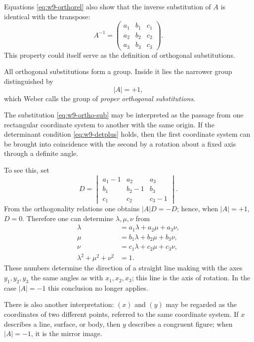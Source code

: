 \documentclass[11pt,a4paper]{book}
\begin{document}
Equations \eqref{eq:w9-orthorel} also show that the inverse substitution of $A$ is identical with the transpose:
\[
 A^{-1}=\begin{pmatrix}
 a_1&b_1&c_1\\
 a_2&b_2&c_2\\
 a_3&b_3&c_3
 \end{pmatrix}.
\]
This property could itself serve as the definition of orthogonal substitutions.

All orthogonal substitutions form a group.  Inside it lies the narrower group distinguished by
\begin{equation}\label{eq:w9-detplus}
 |A|=+1,
\end{equation}
which Weber calls the group of \emph{proper orthogonal substitutions}.

The substitution \eqref{eq:w9-ortho-sub} may be interpreted as the passage from one rectangular coordinate system to another with the same origin.  If the determinant condition \eqref{eq:w9-detplus} holds, then the first coordinate system can be brought into coincidence with the second by a rotation about a fixed axis through a definite angle.

To see this, set
\[
 D=\begin{vmatrix}
 a_1-1&a_2&a_3\\
 b_1&b_2-1&b_3\\
 c_1&c_2&c_3-1
 \end{vmatrix}.
\]
From the orthogonality relations one obtains $|A|D=-D$; hence, when $|A|=+1$, $D=0$.  Therefore one can determine $\lambda,\mu,\nu$ from
\begin{equation}\label{eq:w9-axis}
\begin{aligned}
 \lambda&=a_1\lambda+a_2\mu+a_3\nu,\\
 \mu&=b_1\lambda+b_2\mu+b_3\nu,\\
 \nu&=c_1\lambda+c_2\mu+c_3\nu,\\
 \lambda^2+\mu^2+\nu^2&=1.
\end{aligned}
\end{equation}
These numbers determine the direction of a straight line making with the axes $y_1,y_2,y_3$ the same angles as with $x_1,x_2,x_3$; this line is the axis of rotation.  In the case $|A|=-1$ this conclusion no longer applies.

There is also another interpretation: $(x)$ and $(y)$ may be regarded as the coordinates of two different points, referred to the same coordinate system.  If $x$ describes a line, surface, or body, then $y$ describes a congruent figure; when $|A|=-1$, it is the mirror image.
\end{document}
